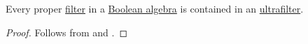\begin{lemma}\label{thm:ultrafilter_lemma}
  Every proper \hyperref[def:lattice_ideal/ideal]{filter} in a \hyperref[def:boolean_algebra]{Boolean algebra} is contained in an \hyperref[def:ultrafilter]{ultrafilter}.
\end{lemma}
\begin{proof}
  Follows from  and .
\end{proof}
